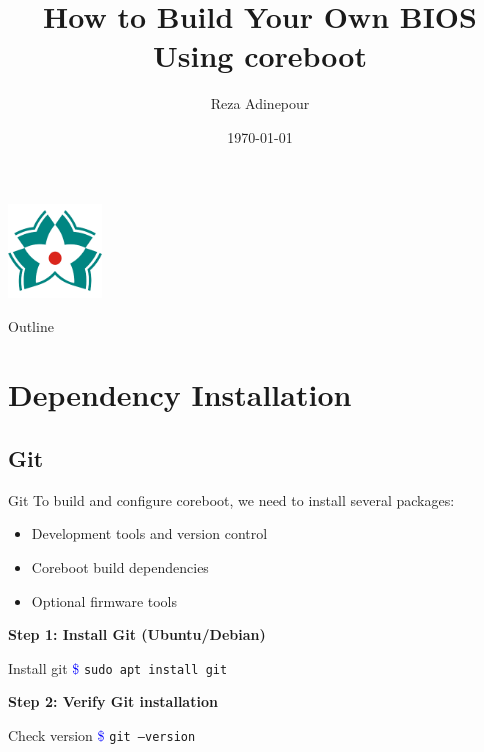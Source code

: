 \documentclass{beamer}
\title[Custom BIOS with coreboot]{How to Build Your Own BIOS Using coreboot}
\author{Reza Adinepour}
\date{\today}
\begin{document}
	
	\begin{frame}
		\titlepage
		\vspace{0.5cm}
		\centering
		\includegraphics[width=2.5cm]{images/logo/logo.png} %
	\end{frame}
	
	\logo{}
	
	\begin{frame}{Outline}
		\tableofcontents
	\end{frame}
	
	\section{Dependency Installation}
	\subsection{Git}
	\begin{frame}{Git}
		To build and configure coreboot, we need to install several packages:
		
		\begin{itemize}
			\item Development tools and version control
			\item Coreboot build dependencies
			\item Optional firmware tools
		\end{itemize}
		
		\vspace{0.4cm}
		\textbf{Step 1: Install Git (Ubuntu/Debian)}
		
		\begin{exampleblock}{Install git}
			\textcolor{blue}{\$} \texttt{sudo apt install git}
		\end{exampleblock}
		
		\textbf{Step 2: Verify Git installation}
		
		\begin{exampleblock}{Check version}
			\textcolor{blue}{\$} \texttt{git --version}
		\end{exampleblock}
	\end{frame}
	
\end{document}
